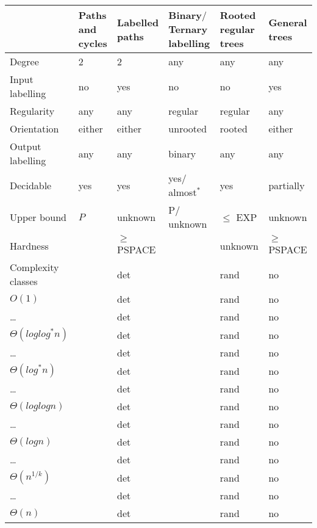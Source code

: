 \begin{table}
  \begin{tabular}{|p{1.90cm}|p{1.90cm}|p{1.90cm}|p{1.90cm}|p{1.90cm}|p{1.90cm}|}
  \hline %
   & Paths and cycles & Labelled paths & Binary$\slash$Ternary labelling & Rooted regular trees & General trees \\
  \hline 
    Degree & 2 & 2 & any & any & any \\
  \hline

    Input labelling & no & yes & no & no & yes \\
  \hline

    Regularity & any & any & regular & regular & any \\
  \hline

    Orientation & either & either & unrooted & rooted & either \\
  \hline

    \raggedright Output labelling & any & any & binary & any & any \\
  \hline

    Decidable & yes & yes & yes$\slash$almost$^*$ & yes & partially \\
  \hline

    Upper bound & $P$ & unknown & P$\slash$unknown & $\leq$ EXP & unknown \\
  \hline

    Hardness &  & $\geq$ PSPACE &  & unknown & $\geq$ PSPACE \\
  \hline

  Complexity classes &  & det &  & rand & no \\
  \hline
  $O(1)$ &  & det &  & rand & no \\
  \hline
  \dots &  & det &  & rand & no \\
  \hline
  $\Theta(log log^* n)$ &  & det &  & rand & no \\
  \hline
  \dots &  & det &  & rand & no \\
  \hline
  $\Theta(log^* n)$ &  & det &  & rand & no \\
  \hline
  \dots &  & det &  & rand & no \\
  \hline
  $\Theta(log log n)$ &  & det &  & rand & no \\
  \hline
  \dots &  & det &  & rand & no \\
  \hline
  $\Theta(log n)$ &  & det &  & rand & no \\
  \hline
  \dots &  & det &  & rand & no \\
  \hline
  $\Theta(n^{1/k})$ &  & det &  & rand & no \\
  \hline
  \dots &  & det &  & rand & no \\
  \hline
  $\Theta(n)$ &  & det &  & rand & no \\
  \hline


\end{tabular}
\end{table}
